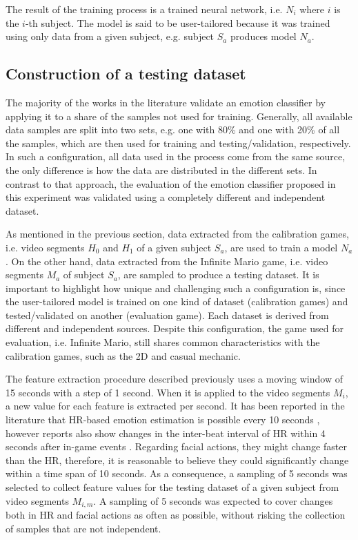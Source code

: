 The result of the training process is a trained neural network, i.e. $N_i$ where $i$ is the $i$-th subject. The model is said to be user-tailored because it was trained using only data from a given subject, e.g. subject $S_a$ produces model $N_a$.

\subsection{Construction of a testing dataset}
\label{sec:experiment2-construction-validation}

The majority of the works in the literature validate an emotion classifier by applying it to a share of the samples not used for training. Generally, all available data samples are split into two sets, e.g. one with 80\% and one with 20\% of all the samples, which are then used for training and testing/validation, respectively. In such a configuration, all data used in the process come from the same source, the only difference is how the data are distributed in the different sets. In contrast to that approach, the evaluation of the emotion classifier proposed in this experiment was validated using a completely different and independent dataset.

As mentioned in the previous section, data extracted from the calibration games, i.e. video segments $H_0$ and $H_1$ of a given subject $S_a$, are used to train a model $N_a$. On the other hand, data extracted from the Infinite Mario game, i.e. video segments $M_a$ of subject $S_a$, are sampled to produce a testing dataset. It is important to highlight how unique and challenging such a configuration is, since the user-tailored model is trained on one kind of dataset (calibration games) and tested/validated on another (evaluation game). Each dataset is derived from different and independent sources. Despite this configuration, the game used for evaluation, i.e. Infinite Mario, still shares common characteristics with the calibration games, such as the 2D and casual mechanic.

The feature extraction procedure described previously uses a moving window of 15 seconds with a step of 1 second. When it is applied to the video segments $M_i$, a new value for each feature is extracted per second. It has been reported in the literature that HR-based emotion estimation is possible every 10 seconds \parencite{valenza2014revealing}, however reports also show changes in the inter-beat interval of HR within 4 seconds after in-game events \parencite{ravaja20051}. Regarding facial actions, they might change faster than the HR, therefore, it is reasonable to believe they could significantly change within a time span of 10 seconds. As a consequence, a sampling of 5 seconds was selected to collect feature values for the testing dataset of a given subject from video segments $M_{i,m}$. A sampling of 5 seconds was expected to cover changes both in HR and facial actions as often as possible, without risking the collection of samples that are not independent.

